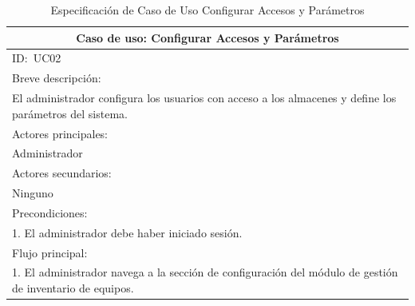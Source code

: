 \documentclass[stu, 12pt, letterpaper, donotrepeattitle, floatsintext, natbib]{apa7}
\begin{document}
\newpage
\begin{longtable}{@{} p{16.5cm} @{}}
    \caption{Especificaci\'on de Caso de Uso Configurar Accesos y Par\'ametros}\label{tab:UC02}                                                        \\ \toprule
    \multicolumn{1}{c}{Caso de uso: Configurar Accesos y Par\'ametros}                                                                                 \\ \midrule
    ID:~UC02                                                                                                                                           \\ \midrule
    Breve descripci\'on:                                                                                                                               \\
    El administrador configura los usuarios con acceso a los almacenes y define los par\'ametros del sistema.                                          \\ \midrule
    Actores principales:                                                                                                                               \\
    Administrador                                                                                                                                      \\ \midrule
    Actores secundarios:                                                                                                                               \\
    Ninguno                                                                                                                                            \\ \midrule
    Precondiciones:                                                                                                                                    \\
    1. El administrador debe haber iniciado sesi\'on.                                                                                                  \\ \midrule
    Flujo principal:                                                                                                                                   \\
    1. El administrador navega a la secci\'on de configuraci\'on del m\'odulo de gesti\'on de inventario de equipos.                                   \\

\end{longtable}
\end{document}
